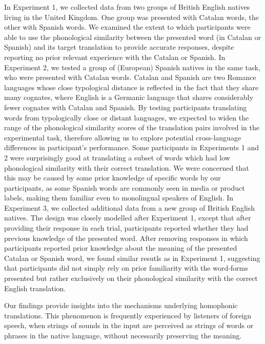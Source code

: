 \documentclass[
]{article}
\begin{document}
In Experiment 1, we collected data from two groups of British English
natives living in the United Kingdom. One group was presented with
Catalan words, the other with Spanish words. We examined the extent to
which participants were able to use the phonological similarity between
the presented word (in Catalan or Spanish) and its target translation to
provide accurate responses, despite reporting no prior relevant
experience with the Catalan or Spanish. In Experiment 2, we tested a
group of (European) Spanish natives in the same task, who were presented
with Catalan words. Catalan and Spanish are two Romance languages whose
close typological distance is reflected in the fact that they share many
cognates, where English is a Germanic language that shares considerably
fewer cognates with Catalan and Spanish. By testing participants
translating words from typologically close or distant languages, we
expected to widen the range of the phonological similarity scores of the
translation pairs involved in the experimental task, therefore allowing
us to explore potential cross-language differences in participant's
performance. Some participants in Experiments 1 and 2 were surprisingly
good at translating a subset of words which had low phonological
similarity with their correct translation. We were concerned that this
may be caused by some prior knowledge of specific words by our
participants, as some Spanish words are commonly seen in media or
product labels, making them familiar even to monolingual speakers of
English. In Experiment 3, we collected additional data from a new group
of British English natives. The design was closely modelled after
Experiment 1, except that after providing their response in each trial,
participants reported whether they had previous knowledge of the
presented word. After removing responses in which participants reported
prior knowledge about the meaning of the presented Catalan or Spanish
word, we found similar resutls as in Experiment 1, suggesting that
participants did not simply rely on prior familiarity with the
word-forms presented but rather exclusively on their phonological
similarity with the correct English translation.

Our findings provide insights into the mechanisms underlying homophonic
translations. This phenomenon is frequently experienced by listeners of
foreign speech, when strings of sounds in the input are perceived as
strings of words or phrases in the native language, without necessarily
preserving the meaning.
\end{document}
